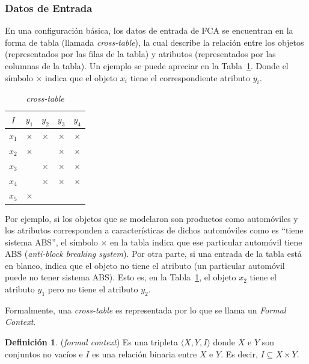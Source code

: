 \documentclass[12pt,oneside,letterpaper]{book}
\newcommand{\eng}[1]{\textit{#1}\xspace}			%
\newcommand{\abr}[1]{\textsc{#1}\xspace}           %
\theoremstyle{definition}
\newtheorem{definition}{Definición}[section]
\begin{document}
\subsubsection{Datos de Entrada}
\label{ssub:datos_de_entrada}
En una configuración básica, los datos de entrada de \abr{FCA} se encuentran en la forma de tabla (llamada \eng{cross-table}), la cual describe la relación entre los objetos (representados por las filas de la tabla) y atributos (representados por las columnas de la tabla). Un ejemplo se puede apreciar en la Tabla~\ref{tbl:cross_table}. Donde el símbolo $\times$ indica que el objeto $x_i$ tiene el correspondiente atributo $y_i$.

\begin{table}[h!]
	\centering
	\begin{tabular}{|c|cccc|}
		\hline
		$I$		& $y_1$		& $y_2$ 	& $y_3$ 	& $y_4$ 	\\ \hline
		$x_1$	& $\times$	& $\times$	& $\times$ 	& $\times$ 	\\
		$x_2$	& $\times$	& 			& $\times$ 	& $\times$ 	\\
		$x_3$	& 			& $\times$	& $\times$ 	& $\times$ 	\\
		$x_4$	& 			& $\times$	& $\times$ 	& $\times$ 	\\
		$x_5$	& $\times$	& 			& 		 	& 		 	\\
		\hline
	\end{tabular}
	\caption{\eng{cross-table}}
	\label{tbl:cross_table}
\end{table}

\newpage
Por ejemplo, si los objetos que se modelaron son productos como automóviles y los atributos corresponden a características de dichos automóviles como es ``tiene sistema \abr{ABS}'', el símbolo $\times$ en la tabla indica que ese particular automóvil tiene \abr{ABS} (\eng{anti-block breaking system}). Por otra parte, si una entrada de la tabla está en blanco, indica que el objeto no tiene el atributo (un particular automóvil puede no tener sistema \abr{ABS}). Esto es, en la Tabla~\ref{tbl:cross_table}, el objeto $x_2$ tiene el atributo $y_1$ pero no tiene el atributo $y_2$.

Formalmente, una \eng{cross-table} es representada por lo que se llama un \eng{Formal Context}.

\theoremstyle{definition}
\begin{definition}{(\eng{formal context})}
Es una tripleta $\langle X,Y,I \rangle$ donde $X$ e $Y$ son conjuntos no vacíos e $I$ es una relación binaria entre $X$ e $Y$. Es decir, $I \subseteq X \times Y$.
\end{definition}
\end{document}
